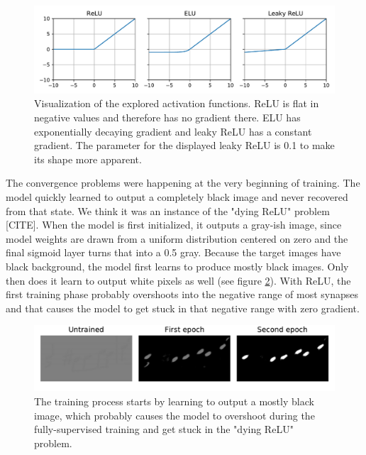 \begin{figure}[ht]
    \centering
    \includegraphics[width=140mm]{../../figures/03-activation-function/functions.pdf}
    \caption{Visualization of the explored activation functions. ReLU is flat in negative values and therefore has no gradient there. ELU has exponentially decaying gradient and leaky ReLU has a constant gradient. The parameter for the displayed leaky ReLU is 0.1 to make its shape more apparent.}
    \label{fig:ActivationFunctions}
\end{figure}

The convergence problems were happening at the very beginning of training. The model quickly learned to output a completely black image and never recovered from that state. We think it was an instance of the "dying ReLU" problem [CITE]. When the model is first initialized, it outputs a gray-ish image, since model weights are drawn from a uniform distribution centered on zero and the final sigmoid layer turns that into a 0.5 gray. Because the target images have black background, the model first learns to produce mostly black images. Only then does it learn to output white pixels as well (see figure \ref{fig:ActivationTrainingProgression}). With ReLU, the first training phase probably overshoots into the negative range of most synapses and that causes the model to get stuck in that negative range with zero gradient.

\begin{figure}[ht]
    \centering
    \includegraphics[width=140mm]{../../figures/03-activation-function/progression.pdf}
    \caption{The training process starts by learning to output a mostly black image, which probably causes the model to overshoot during the fully-supervised training and get stuck in the "dying ReLU" problem.}
    \label{fig:ActivationTrainingProgression}
\end{figure}

